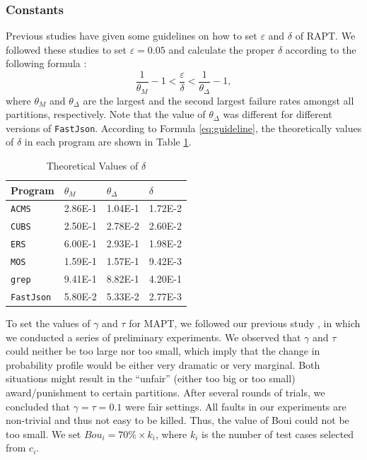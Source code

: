 \documentclass[10pt,journal,compsoc]{IEEEtran}
\begin{document}
\subsubsection{Constants}
\label{sec:constants}

Previous studies \cite{Lv2011, Yang2014, li2015approach,sun2018adaptive} have given some guidelines on how to set $\varepsilon$ and $\delta$ of RAPT. We followed these studies to set $\varepsilon = 0.05$ and calculate the proper $\delta$ according to the following formula \cite{li2015approach}:
\begin{equation}
  \label{eq:guideline}
  \frac{1}{\theta_M} - 1 < \frac{\varepsilon}{\delta} < \frac{1}{\theta_{\Delta}} - 1,
\end{equation}
where $\theta_M$ and $\theta_{\Delta}$ are the largest and the second largest failure rates amongst all partitions, respectively. Note that the value of $\theta_{\Delta}$ was different for different versions of \texttt{FastJson}. According to Formula \ref{eq:guideline}, the theoretically values of $\delta$ in each program are shown in Table \ref{tab:parameters}.

\begin{table}
  \caption{Theoretical Values of $\delta$}
  \label{tab:parameters}
  \centering
  \begin{tabular}{llll} \toprule
     Program                           &$\theta_M$      &$\theta_{\Delta}$   & $\delta$ \\\midrule
     \texttt{ACMS}                     &2.86E-1         &1.04E-1             &1.72E-2           \\
     \texttt{CUBS}                     &2.50E-1         &2.78E-2             &2.60E-2            \\
     \texttt{ERS}                      &6.00E-1         &2.93E-1             &1.98E-2            \\
     \texttt{MOS}                      &1.59E-1         &1.57E-1             &9.42E-3            \\
     \texttt{grep}                     &9.41E-1         &8.82E-1             &4.20E-1\\
     \texttt{FastJson}                 &5.80E-2         &5.33E-2             &2.77E-3\\ \bottomrule
  \end{tabular}
\end{table}

To set the values of $\gamma$ and $\tau$ for MAPT, we followed our previous study \cite{sun2018adaptive}, in which we conducted a series of preliminary experiments. We observed that $\gamma$ and $\tau$ could neither be too large nor too small, which imply that the change in probability profile would be either very dramatic or very marginal. Both situations might result in the ``unfair''
(either too big or too small) award/punishment to certain partitions. After several rounds of trials, we concluded that $\gamma = \tau = 0.1$ were fair settings. All faults in our experiments are non-trivial and thus not easy to be killed. Thus, the value
of Boui could not be too small. We set $Bou_i = 70\% \times k_i$, where $k_i$ is the number of test cases selected from $c_i$.
\end{document}
